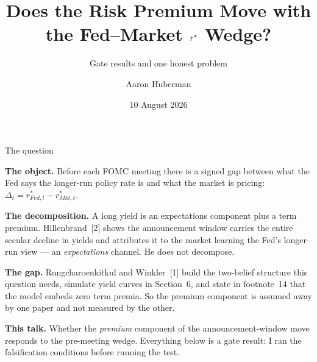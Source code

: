 \documentclass[aspectratio=169, 11pt]{beamer}
\title[Fed--Market $\rstar$ Wedge]{Does the Risk Premium Move with the
Fed--Market $\rstar$ Wedge?}
\subtitle{Gate results and one honest problem}
\author{Aaron Huberman}
\institute{Duke University}
\date{10 August 2026}
\newcommand{\rstar}{r^{*}}
\begin{document}
\begin{frame}[plain]
    \titlepage
\end{frame}

\begin{frame}{The question}

\textbf{The object.} Before each FOMC meeting there is a signed gap between
what the Fed says the longer-run policy rate is and what the market is
pricing: $\Delta_t = \rstar_{Fed,t} - \rstar_{Mkt,t}$.

\vspace{0.7em}

\textbf{The decomposition.} A long yield is an expectations component plus a
term premium. Hillenbrand~[2] shows the announcement window carries the entire
secular decline in yields and attributes it to the market learning the Fed's
longer-run view --- an \emph{expectations} channel. He does not decompose.

\vspace{0.7em}

\textbf{The gap.} Rungcharoenkitkul and Winkler~[1] build the two-belief
structure this question needs, simulate yield curves in Section~6, and state
in footnote~14 that the model embeds zero term premia. So the premium
component is assumed away by one paper and not measured by the other.

\vspace{0.7em}

\textbf{This talk.} Whether the \emph{premium} component of the
announcement-window move responds to the pre-meeting wedge. Everything below
is a gate result: I ran the falsification conditions before running the test.

\end{frame}
\end{document}
